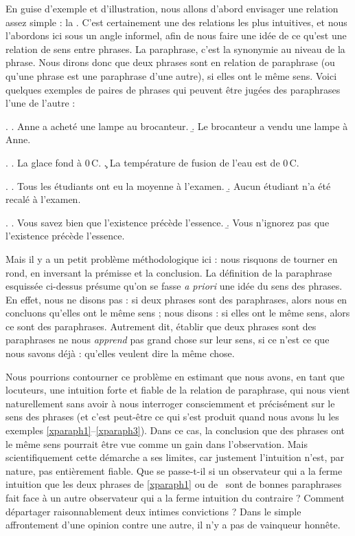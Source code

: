 \begin{refsegment}
En guise d'exemple et d'illustration, nous allons d'abord envisager une
relation assez simple : la .  
C'est  certainement une des relations les plus intuitives, et nous l'abordons ici  sous un angle informel, 
afin de nous faire une idée de ce qu'est une relation de sens
entre phrases.
La paraphrase, c'est la synonymie au niveau de la phrase.  Nous dirons donc
que deux phrases sont en relation de paraphrase (ou qu'une phrase est
une paraphrase d'une autre), si elles ont le même
sens.\label{d:paraphrase}  Voici quelques exemples de paires de phrases qui peuvent être jugées des paraphrases l'une de l'autre :



\ex.\label{xparaph1}
\a.  Anne a acheté une lampe au brocanteur.
\b. Le brocanteur a vendu une lampe à Anne.

\ex.\label{xparaph2}
\a.  La glace  fond à 0\,\degres C.
\c. La température de fusion de l'eau est de 0\,\degres C.

\ex.\label{xparaph2.5}
\a. Tous les étudiants ont eu la moyenne à l'examen.
\b. Aucun étudiant n'a été recalé à l'examen.

\ex.\label{xparaph3}
\a. Vous savez bien que l'existence précède l'essence.
\b. Vous n'ignorez pas que l'existence précède l'essence.




Mais il y a un petit problème méthodologique ici : nous risquons de tourner en rond, en inversant la prémisse et la conclusion.  
La définition de la
paraphrase esquissée ci-dessus présume qu'on se fasse \emph{a priori} une idée du sens des
phrases.  En effet, nous ne disons pas : si deux phrases sont des paraphrases, alors nous en concluons qu'elles ont le même sens ; 
nous disons : si elles ont le même sens, alors ce
sont des paraphrases.  
Autrement dit, établir que deux phrases sont des paraphrases ne nous \emph{apprend} pas grand chose sur leur sens, si ce n'est ce que nous savons déjà : qu'elles veulent dire la même chose.

\largerpage[-1]

Nous pourrions contourner ce problème en estimant que nous avons, en tant que locuteurs, une intuition forte et fiable de la relation de paraphrase, qui nous vient naturellement sans avoir à nous interroger consciemment et précisément sur le sens des phrases (et c'est peut-être ce qui s'est produit quand nous avons lu 
les exemples \ref{xparaph1}--\ref{xparaph3}).  Dans ce cas, la conclusion que des phrases ont le même sens pourrait être vue comme un gain dans l'observation. Mais scientifiquement cette démarche a ses limites, car justement l'intuition n'est, par nature, pas entièrement fiable.  Que se passe-t-il si un observateur qui a la ferme intuition que les deux phrases de \ref{xparaph1} ou de \Next\ sont de bonnes paraphrases fait face à un autre observateur qui a la ferme intuition du contraire ? Comment départager raisonnablement deux intimes convictions ?  Dans le simple affrontement d'une opinion contre une autre, il n'y a pas de vainqueur honnête.


\end{refsegment}
